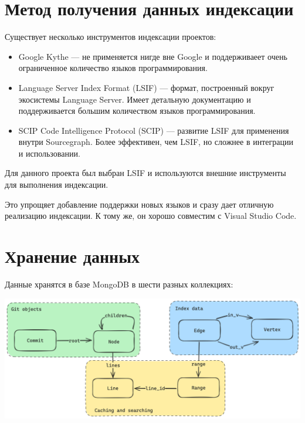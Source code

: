 \documentclass[aspectratio=169,professionalfonts,10pt]{beamer}
\begin{document}
\section{Метод получения данных индексации}
\begin{frame}{\insertsection}

Существует несколько инструментов индексации проектов:
\begin{itemize}
    \item Google Kythe \cite{Kythe} — не применяется нигде вне Google и поддерживаеет очень ограниченное количество языков программирования.
    \item Language Server Index Format (LSIF) \cite{lsif} — формат, построенный вокруг экосистемы Language Server. Имеет детальную документацию и поддерживается большим количеством языков программирования.
    \item SCIP Code Intelligence Protocol (SCIP) \cite{scip} — развитие LSIF для применения внутри Sourcegraph. Более эффективен, чем LSIF, но сложнее в интеграции и использовании.
\end{itemize}

Для данного проекта был выбран LSIF и используются внешние инструменты для выполнения индексации.

Это упрощяет добавление поддержки новых языков и сразу дает отличную реализацию индексации. К тому же, он хорошо совместим с Visual Studio Code.

\end{frame}

\section{Хранение данных}
\begin{frame}{\insertsection}

Данные хранятся в базе MongoDB в шести разных коллекциях:

\includegraphics[width=\textwidth]{figures/model.png}

\end{frame}
\end{document}

